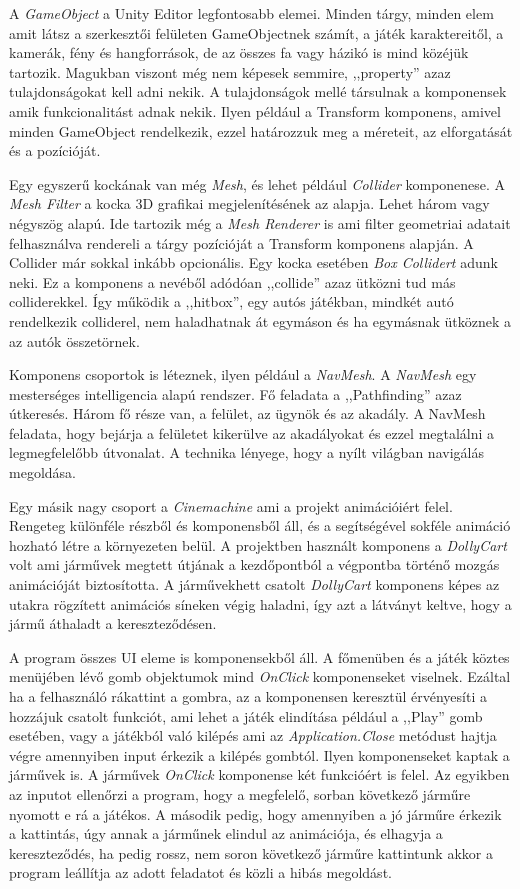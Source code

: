 \documentclass[
]{thesis-ekf}
\theoremstyle{definition}
\theoremstyle{remark}
\begin{document}
A \textit{GameObject} a Unity Editor legfontosabb elemei. Minden tárgy, minden elem amit látsz a szerkesztői felületen GameObjectnek számít, a játék karaktereitől, a kamerák, fény és hangforrások, de az összes fa vagy házikó is mind közéjük tartozik. Magukban viszont még nem képesek semmire, ,,property'' azaz tulajdonságokat kell adni nekik. A tulajdonságok mellé társulnak a komponensek amik funkcionalitást adnak nekik. Ilyen például a Transform komponens, amivel minden GameObject rendelkezik, ezzel határozzuk meg a méreteit, az elforgatását és a pozícióját. 

Egy egyszerű kockának van még \textit{Mesh}, és lehet például \textit{Collider} komponenese. A \textit{Mesh Filter} a kocka 3D grafikai megjelenítésének az alapja. Lehet három vagy négyszög alapú. Ide tartozik még a \textit{Mesh Renderer} is ami filter geometriai adatait felhasználva rendereli a tárgy pozícióját a Transform komponens alapján. A Collider már sokkal inkább opcionális. Egy kocka esetében \textit{Box Collidert} adunk neki. Ez a komponens a nevéből adódóan ,,collide'' azaz ütközni tud más colliderekkel. Így működik a ,,hitbox'', egy autós játékban, mindkét autó rendelkezik colliderel, nem haladhatnak át egymáson és ha egymásnak ütköznek a az autók összetörnek.

Komponens csoportok is léteznek, ilyen például a \textit{NavMesh}. A \textit{NavMesh} egy mesterséges intelligencia alapú rendszer. Fő feladata a ,,Pathfinding'' azaz útkeresés. Három fő része van, a felület, az ügynök és az akadály. A NavMesh feladata, hogy bejárja a felületet kikerülve az akadályokat és ezzel megtalálni a legmegfelelőbb útvonalat. A technika lényege, hogy a nyílt világban navigálás megoldása. \cite{navmesh}

Egy másik nagy csoport a \textit{Cinemachine} ami a projekt animációiért felel. Rengeteg különféle részből és komponensből áll, és a segítségével sokféle animáció hozható létre a környezeten belül. A projektben használt komponens a \textit{DollyCart}\cite{cinemachine} volt ami járművek megtett útjának a kezdőpontból a végpontba történő mozgás animációját biztosította. A járművekhett csatolt \textit{DollyCart} komponens képes az utakra rögzített animációs síneken végig haladni, így azt a látványt keltve, hogy a jármű áthaladt a kereszteződésen.

A program összes UI eleme is komponensekből áll. A főmenüben és a játék köztes menüjében lévő gomb objektumok mind \textit{OnClick} komponenseket viselnek. Ezáltal ha a felhasználó rákattint a gombra, az a komponensen keresztül érvényesíti a hozzájuk csatolt funkciót, ami lehet a játék elindítása például a ,,Play'' gomb esetében, vagy a játékból való kilépés ami az \textit{Application.Close} metódust hajtja végre amennyiben input érkezik a kilépés gombtól. Ilyen komponenseket kaptak a járművek is. A járművek \textit{OnClick} komponense két funkcióért is felel. Az egyikben az inputot ellenőrzi a program, hogy a megfelelő, sorban következő járműre nyomott e rá a játékos. A második pedig, hogy amennyiben a jó járműre érkezik a kattintás, úgy annak a járműnek elindul az animációja, és elhagyja a kereszteződés, ha pedig rossz, nem soron következő járműre kattintunk akkor a program leállítja az adott feladatot és közli a hibás megoldást.
\end{document}
